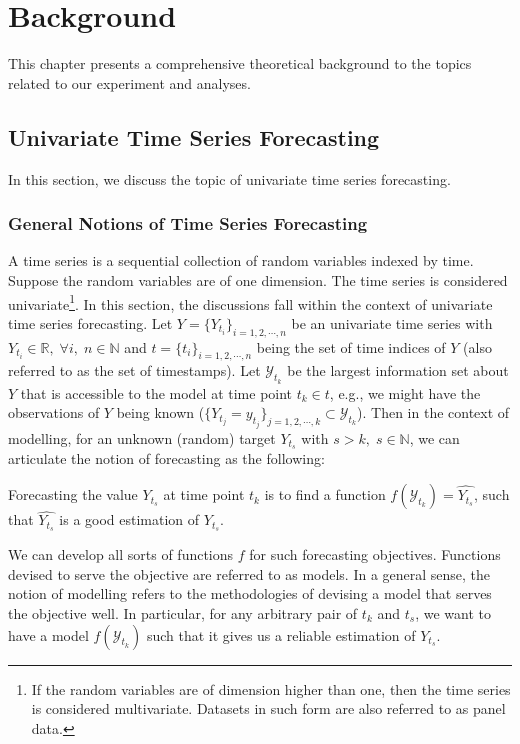 \chapter{Background}\label{ch: background}

This chapter presents a comprehensive theoretical background to the topics related to our experiment and analyses.

\section{Univariate Time Series Forecasting}
In this section, we discuss the topic of univariate time series forecasting.

\subsection{General Notions of Time Series Forecasting}
A time series is a sequential collection of random variables indexed by time. Suppose the random variables are of one dimension. The time series is considered univariate\footnote{If the random variables are of dimension higher than one, then the time series is considered multivariate. Datasets in such form are also referred to as panel data.}. In this section, the discussions fall within the context of univariate time series forecasting. Let $Y = \{Y_{t_i} \}_{i = 1, 2, \cdots, n}$ be an univariate time series with $ Y_{t_i} \in \mathbb{R}, \; \forall i, \; n \in \mathbb{N}$ and $t = \{t_i \}_{i = 1, 2, \cdots, n}$ being the set of time indices of $Y$ (also referred to as the set of timestamps). Let $\mathcal{Y}_{t_k}$ be the largest information set about $Y$ that is accessible to the model at time point $t_k \in t$, e.g., we might have the observations of $Y$ being known ($\{Y_{t_j} = y_{t_j}\}_{j = 1, 2, \cdots, k } \subset \mathcal{Y}_{t_k}$). Then in the context of modelling, for an unknown (random) target $Y_{t_s}$ with $s > k, \; s \in \mathbb{N}$, we can articulate the notion of forecasting as the following:
\begin{displayquote}
    Forecasting the value $Y_{t_s}$ at time point $t_k$ is to find a function $f(\mathcal{Y}_{t_k}) = \widehat{Y_{t_s}}$, such that $\widehat{Y_{t_s}}$ is a good estimation of $Y_{t_s}$.
\end{displayquote}
We can develop all sorts of functions $f$ for such forecasting objectives. Functions devised to serve the objective are referred to as models. In a general sense, the notion of modelling refers to the methodologies of devising a model that serves the objective well. In particular, for any arbitrary pair of $t_k$ and $t_s$, we want to have a model $f(\mathcal{Y}_{t_k})$ such that it gives us a reliable estimation of $Y_{t_s}$.

